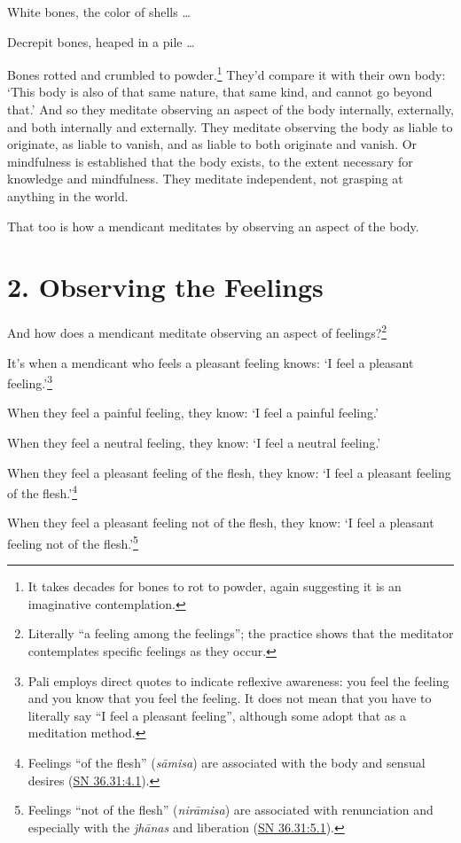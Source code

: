 \documentclass[12pt,openany]{book}%
\begin{document}
White bones, the color of shells … 

Decrepit bones, heaped in a pile … 

Bones rotted and crumbled to powder.\footnote{It takes decades for bones to rot to powder, again suggesting it is an imaginative contemplation. } They’d compare it with their own body: ‘This body is also of that same nature, that same kind, and cannot go beyond that.’ And so they meditate observing an aspect of the body internally, externally, and both internally and externally. They meditate observing the body as liable to originate, as liable to vanish, and as liable to both originate and vanish. Or mindfulness is established that the body exists, to the extent necessary for knowledge and mindfulness. They meditate independent, not grasping at anything in the world. 

That too is how a mendicant meditates by observing an aspect of the body. 

\section*{2. Observing the Feelings }

And how does a mendicant meditate observing an aspect of feelings?\footnote{Literally “a feeling among the feelings”; the practice shows that the meditator contemplates specific feelings as they occur. } 

It’s when a mendicant who feels a pleasant feeling knows: ‘I feel a pleasant feeling.’\footnote{Pali employs direct quotes to indicate reflexive awareness: you feel the feeling and you know that you feel the feeling. It does not mean that you have to literally say “I feel a pleasant feeling”, although some adopt that as a meditation method. } 

When they feel a painful feeling, they know: ‘I feel a painful feeling.’ 

When they feel a neutral feeling, they know: ‘I feel a neutral feeling.’ 

When they feel a pleasant feeling of the flesh, they know: ‘I feel a pleasant feeling of the flesh.’\footnote{Feelings “of the flesh” (\textit{\textsanskrit{sāmisa}})  are associated with the body and sensual desires (\href{https://suttacentral.net/sn36.31/en/sujato\#4.1}{SN 36.31:4.1}). } 

When they feel a pleasant feeling not of the flesh, they know: ‘I feel a pleasant feeling not of the flesh.’\footnote{Feelings “not of the flesh” (\textit{\textsanskrit{nirāmisa}}) are associated with renunciation and especially with the \textit{\textsanskrit{jhānas}} and liberation (\href{https://suttacentral.net/sn36.31/en/sujato\#5.1}{SN 36.31:5.1}). } 
\end{document}

